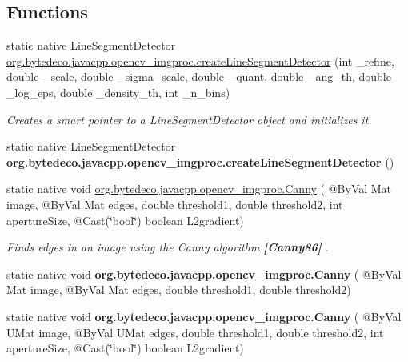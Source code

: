 \subsection*{Functions}
\begin{DoxyCompactItemize}
\item 
static native Line\+Segment\+Detector \hyperlink{group__imgproc__feature_ga19a371ab2269ddf309820d928394498d}{org.\+bytedeco.\+javacpp.\+opencv\+\_\+imgproc.\+create\+Line\+Segment\+Detector} (int \+\_\+refine, double \+\_\+scale, double \+\_\+sigma\+\_\+scale, double \+\_\+quant, double \+\_\+ang\+\_\+th, double \+\_\+log\+\_\+eps, double \+\_\+density\+\_\+th, int \+\_\+n\+\_\+bins)
\begin{DoxyCompactList}\small\item\em Creates a smart pointer to a Line\+Segment\+Detector object and initializes it. \end{DoxyCompactList}\item 
\mbox{\label{group__imgproc__feature_gad70c4ef3abb03e4760dac81420f4ab48}} 
static native Line\+Segment\+Detector {\bfseries org.\+bytedeco.\+javacpp.\+opencv\+\_\+imgproc.\+create\+Line\+Segment\+Detector} ()
\item 
static native void \hyperlink{group__imgproc__feature_gae85c4c5d2fd8006e4194e3ee73d2277d}{org.\+bytedeco.\+javacpp.\+opencv\+\_\+imgproc.\+Canny} ( @By\+Val Mat image, @By\+Val Mat edges, double threshold1, double threshold2, int aperture\+Size, @Cast(\char`\"{}bool\char`\"{}) boolean L2gradient)
\begin{DoxyCompactList}\small\item\em Finds edges in an image using the Canny algorithm {\bfseries [Canny86]} . \end{DoxyCompactList}\item 
\mbox{\label{group__imgproc__feature_ga26772144cdf60d6f4d66e3aab52e6707}} 
static native void {\bfseries org.\+bytedeco.\+javacpp.\+opencv\+\_\+imgproc.\+Canny} ( @By\+Val Mat image, @By\+Val Mat edges, double threshold1, double threshold2)
\item 
\mbox{\label{group__imgproc__feature_gaf8f39f1926eb8a0a1b4bc7d5ee2cbdb9}} 
static native void {\bfseries org.\+bytedeco.\+javacpp.\+opencv\+\_\+imgproc.\+Canny} ( @By\+Val U\+Mat image, @By\+Val U\+Mat edges, double threshold1, double threshold2, int aperture\+Size, @Cast(\char`\"{}bool\char`\"{}) boolean L2gradient)

\end{DoxyCompactItemize}
